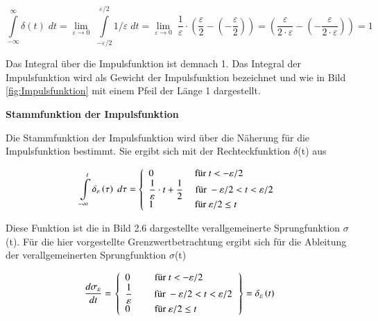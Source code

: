 \begin{equation}\label{eq:onethirtynine}
\int\limits _{-\infty }^{\infty }\delta \left(t\right) \; dt ={\mathop{\lim }\limits_{\varepsilon \to 0}} \; \int\limits _{-\varepsilon /2}^{\varepsilon /2}1/\varepsilon \; dt ={\mathop{\lim }\limits_{\varepsilon \to 0}} \; \dfrac{1}{\varepsilon } \cdot \left(\dfrac{\varepsilon }{2} -\left(-\dfrac{\varepsilon }{2} \right)\right)=\left(\dfrac{\varepsilon }{2\cdot \varepsilon } -\left(-\dfrac{\varepsilon }{2\cdot \varepsilon } \right)\right)=1
\end{equation}


\noindent Das Integral über die Impulsfunktion ist demnach 1. Das Integral der Impulsfunktion wird als Gewicht der Impulsfunktion bezeichnet und wie in Bild \ref{fig:Impulsfunktion} mit einem Pfeil der Länge 1 dargestellt. \bigskip

{\selectfont
\noindent\textbf{Stammfunktion der Impulsfunktion}} \smallskip

\noindent Die Stammfunktion der Impulsfunktion wird \"{u}ber die N\"{a}herung f\"{u}r die Impulsfunktion bestimmt. Sie ergibt sich mit der Rechteckfunktion $\delta$(t) aus

\begin{equation}\label{eq:onefourty}
\int\limits _{-\infty }^{t}\delta _{\varepsilon } \left(\tau \right) \; d\tau  =\left\{\begin{array}{ll}
{0\qquad \qquad \text{ für } t<-\varepsilon /2} \\
{\dfrac{1}{\varepsilon } \cdot t+\dfrac{ 1}{ 2} \quad \text{ für } -\varepsilon /2<t<\varepsilon /2} \\ 
{1\qquad \qquad  \text{ für }\varepsilon /2 \le t} \end{array}\right. \\
\end{equation}

\noindent Diese Funktion ist die in Bild 2.6 dargestellte verallgemeinerte Sprungfunktion $\sigma$(t). F\"{u}r die hier vorgestellte Grenzwertbetrachtung ergibt sich f\"{u}r die Ableitung der verallgemeinerten Sprungfunktion $\sigma$(t)

\begin{equation}\label{eq:onefourtyone}
\dfrac{d\sigma _{\varepsilon } }{dt} =\left. \left\{\begin{array}{l} 
{0 \qquad \; \text{ für } t<-\varepsilon /2} \\
{\dfrac{1}{\varepsilon} \qquad \text{ für } - \varepsilon /2 <t< \varepsilon /2} \\ 
{0 \qquad \; \text{ für } \varepsilon /2 \le t} \end{array}\right. \right\}=\delta _{\varepsilon } \left(t\right)\\
\end{equation}


